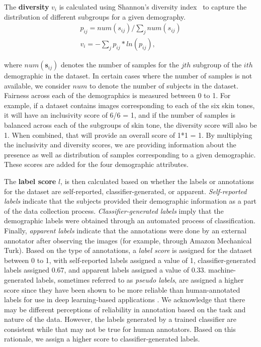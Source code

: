 \documentclass[journal]{IEEEtran}
\begin{document}
The \textbf{diversity} $v_i$ is calculated using Shannon's diversity index~\cite{shannon1948mathematical} to capture the distribution of different subgroups for a given demography. 
\begin{gather}
    p_{ij} = num(s_{ij})/\sum_j{num(s_{ij})}  \\
    v_i = - \sum_j{p_{ij} * ln(p_{ij})},
\end{gather}

where $num(\textbf{s}_{ij})$ denotes the number of samples for the $jth$ subgroup of the $ith$ demographic in the dataset. In certain cases where the number of samples is not available, we consider $num$ to denote the number of subjects in the dataset. Fairness across each of the demographics is measured between 0 to 1. For example, if a dataset contains images corresponding to each of the six skin tones, it will have an inclusivity score of 6/6 = 1, and if the number of samples is balanced across each of the subgroups of skin tone, the diversity score will also be 1. When combined, that will provide an overall score of 1*1 = 1. By multiplying the inclusivity and diversity scores, we are providing information about the presence as well as distribution of samples corresponding to a given demographic. These scores are added for the four demographic attributes.

The \textbf{label score} $l$, is then calculated based on whether the labels or annotations for the dataset are self-reported, classifier-generated, or apparent. \textit{Self-reported labels} indicate that the subjects provided their demographic information as a part of the data collection process. \textit{Classifier-generated labels} imply that the demographic labels were obtained through an automated process of classification. Finally, \textit{apparent labels} indicate that the annotations were done by an external annotator after observing the images (for example, through Amazon Mechanical Turk). Based on the type of annotations, a \textit{label score} is assigned for the dataset between 0 to 1, with self-reported labels assigned a value of 1, classifier-generated labels assigned 0.67, and apparent labels assigned a value of 0.33. machine-generated labels, sometimes referred to as {\em pseudo labels}, are assigned a higher score since they have been shown to be more reliable than human-annotated labels for use in deep learning-based applications \cite{lee2013pseudo, tuan2017regressing, chang2019deep}. We acknowledge that there may be different perceptions of reliability in annotation based on the task and nature of the data. However, the labels generated by a trained classifier are consistent while that may not be true for human annotators. Based on this rationale, we assign a higher score to classifier-generated labels. 
\end{document}
